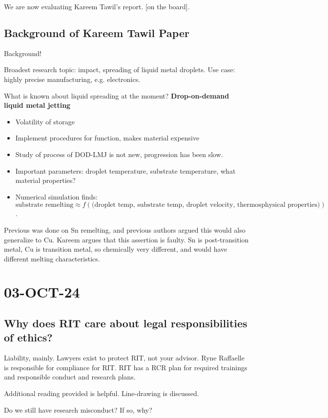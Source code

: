 \documentclass[10pt, oneside]{article}
\begin{document}
We are now evaluating Kareem Tawil's report. [on the board].

\subsection{Background of Kareem Tawil Paper}
Background!

Broadest research topic: impact, spreading of liquid metal droplets. Use case: highly precise manufacturing, e.g. electronics.

What is known about liquid spreading at the moment?
\textbf{Drop-on-demand liquid metal jetting}
\begin{itemize}
    \item Volatility of storage
    \item Implement procedures for function, makes material expensive
    \item Study of process of DOD-LMJ is not new, progression has been slow. 
    \item Important parameters: droplet temperature, substrate temperature, what material properties?
    \item Numerical simulation finds:\[\text{substrate remelting} \approx f(\text{(droplet temp, substrate temp, droplet velocity, thermosphysical properties)})\]. 
\end{itemize}

Previous was done on Sn remelting, and previous authors argued this would also generalize to Cu. Kareem argues that this assertion is faulty. Sn is post-transition metal, Cu is transition metal, so chemically very different, and would have different melting characteristics. 
\section{03-OCT-24}
\subsection{Why does RIT care about legal responsibilities of ethics?}
Liability, mainly. Lawyers exist to protect RIT, not your advisor. Ryne Raffaelle is responsible for compliance for RIT. RIT has a RCR plan for required trainings and responsible conduct and research plans. 

Additional reading provided is helpful. Line-drawing is discussed. 

Do we still have research misconduct? If so, why?
\end{document}
